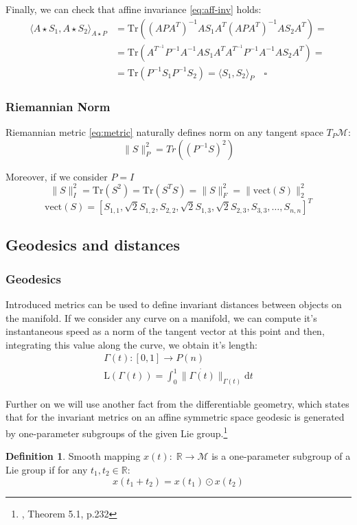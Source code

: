 \documentclass[12pt]{extarticle}
\theoremstyle{definition}
\newtheorem{definition}{Definition}[section]
\theoremstyle{remark}
\begin{document}
	Finally, we can check that affine invariance \cref{eq:aff-inv} holds:
	\begin{align*}
	\langle A\star S_1, A\star  S_2 \rangle_{A\star P} &= \text{Tr}((A PA^T)^{-1}A S_1A^T(A PA^T)^{-1}A S_2A^T) = \\
	&=\text{Tr}(A^{T^{-1}}P^{-1} A^{-1}AS_1A^TA^{T^{-1}}P^{-1}A^{-1}AS_2A^T) =\\ & 
	= \text{Tr}(P^{-1}S_1P^{-1}S_2) = \langle S_1, S_2\rangle_P\quad \square
	\end{align*}
	
	\subsubsection*{Riemannian Norm}
	Riemannian metric \cref{eq:metric} naturally defines norm on any tangent space $T_P\mathcal{M}$:
	\begin{equation*}
	\|S\|_P^2 = Tr((P^{-1}S)^2)
	\end{equation*}
	
	Moreover, if we consider $P = I$
	\begin{equation*}
	\|S\|_I^2 = \text{Tr}(S^2) =  \text{Tr}(S^TS) = \|S\|_F^2 = \|\text{vect}(S)\|_2^2
	\end{equation*}
	\begin{equation}\label{eq:vect}
	\text{vect}(S) = \left[ S_{1,1}, \sqrt{2}S_{1,2}, S_{2,2}, \sqrt{2}S_{1,3} ,  \sqrt{2}S_{2,3}, S_{3,3}, \dots, S_{n,n}  \right]^T
	\end{equation}
	
	\subsection{Geodesics and distances}
	\subsubsection*{Geodesics}
	Introduced metrics can be used to define invariant distances between objects on the manifold. If we consider any curve on a manifold, we can compute it's instantaneous speed as a norm of the tangent vector at this point and then, integrating this value along the curve, we obtain it's length:
	\begin{align*}
	\Gamma(t): [0, 1] \rightarrow P(n) \\
	\text{L}(\Gamma(t)) = \int_{0}^{1} \|\dot{\Gamma(t)}\|_{\Gamma(t)}\text{d}t
	\end{align*} 
	
	Further on we will use another fact from the differentiable geometry, which states that for the invariant metrics on an affine symmetric space geodesic is generated by one-parameter subgroups of the given Lie group.\footnote{\cite{Sternberg1964}, Theorem 5.1, p.232}
	\begin{definition}
		Smooth mapping $x(t):\; \mathbb{R} \rightarrow \mathcal{M}$ is a one-parameter subgroup of a Lie group if for any $t_1, t_2 \in \mathbb{R}$:
		\begin{equation*}
		x(t_1 + t_2) = x(t_1)\odot x(t_2)
		\end{equation*}
	\end{definition}
	
\end{document}
